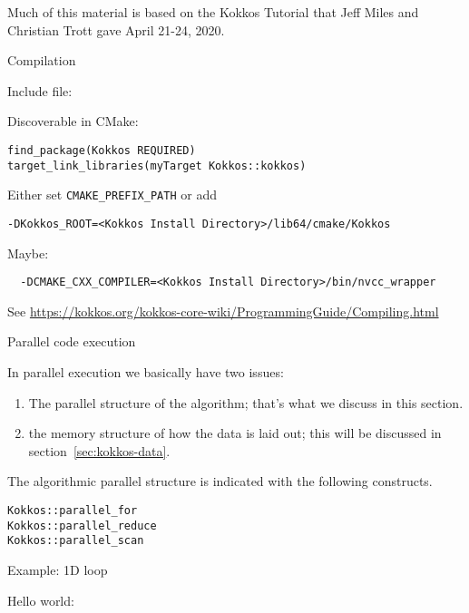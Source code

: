 
Much of this material is based on the 
Kokkos Tutorial
that 
Jeff Miles and Christian Trott
gave
April 21-24, 2020.

 {Compilation}

Include file:

Discoverable in CMake:
\begin{lstlisting}
find_package(Kokkos REQUIRED)
target_link_libraries(myTarget Kokkos::kokkos)
\end{lstlisting}
Either set \lstinline{CMAKE_PREFIX_PATH} or add
\begin{lstlisting}
-DKokkos_ROOT=<Kokkos Install Directory>/lib64/cmake/Kokkos
\end{lstlisting}
Maybe:
\begin{lstlisting}
  -DCMAKE_CXX_COMPILER=<Kokkos Install Directory>/bin/nvcc_wrapper
\end{lstlisting}
See \url{https://kokkos.org/kokkos-core-wiki/ProgrammingGuide/Compiling.html}

 {Parallel code execution}

In parallel execution we basically have two issues:
\begin{enumerate}
\item The parallel structure of the algorithm;
  that's what we discuss in this section.
\item the memory structure of how the data is laid out;
  this will be discussed in section~\ref{sec:kokkos-data}.
\end{enumerate}

The algorithmic parallel structure is indicated with the following constructs.
\begin{lstlisting}
Kokkos::parallel_for
Kokkos::parallel_reduce
Kokkos::parallel_scan
\end{lstlisting}

 {Example: 1D loop}

Hello world:

